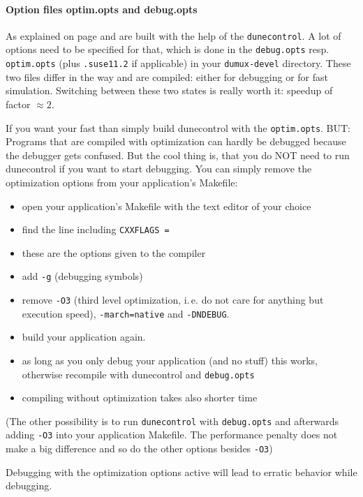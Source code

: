 \paragraph{Option files optim.opts and debug.opts}

As explained on page \pageref{buildIt} \Dune and \Dumux are built with the help of the \texttt{dunecontrol}. 
A lot of options need to be specified for that, which is done in the \texttt{debug.opts} resp. \texttt{optim.opts}
(plus \texttt{.suse11.2} if applicable) in your \texttt{dumux-devel} directory. These two files differ in the way \Dune and \Dumux are compiled: either for debugging or for fast simulation. Switching between these two states is really 
worth it: speedup of factor $\approx 2$. 

If you want your \Dumux fast than simply build dunecontrol with the \texttt{optim.opts}. BUT: Programs that are compiled with optimization can hardly 
be debugged because the debugger gets confused. But the cool thing is, that you do NOT need to run dunecontrol if you want to start debugging. You can simply remove the optimization options from your application's Makefile:
\begin{itemize}
\item open your application's Makefile with the text editor of your choice
\item find the line including \texttt{CXXFLAGS =}
\item these are the options given to the \Cplusplus compiler
\item add \texttt{-g} (debugging symbols)
\item remove \texttt{-O3} (third level optimization, i.\,e. do not care for anything but execution speed),  \texttt{-march=native} and \texttt{-DNDEBUG}.
\item build your application again. 
\item as long as you only debug your application (and no \Dune stuff) this works, otherwise recompile with dunecontrol and \texttt{debug.opts}
\item compiling without optimization takes also shorter time
\end{itemize}

(The other possibility is to run \texttt{dunecontrol} with \texttt{debug.opts} and afterwards adding \texttt{-O3} into your application Makefile. The performance penalty does not make a big difference and so do the other options besides \texttt{-O3})

Debugging with the optimization options active will lead to erratic behavior while debugging. 

